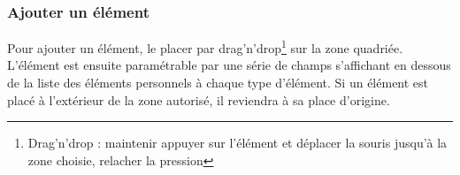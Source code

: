 \documentclass[a4paper,11pt,final]{report}
\begin{document}
\noindent\begin{minipage}{\linewidth}%
\label{elements}
\end{minipage}

\subsubsection{Ajouter un élément}
Pour ajouter un élément, le placer par drag'n'drop\footnote{Drag'n'drop : maintenir appuyer sur l'élément et déplacer la souris jusqu'à la zone choisie, relacher la pression} sur la zone quadriée.\\ 
L'élément est ensuite paramétrable par une série de champs s'affichant en dessous de la liste des éléments personnels à chaque type d'élément.
Si un élément est placé à l'extérieur de la zone autorisé, il reviendra à sa place d'origine.
\end{document}

